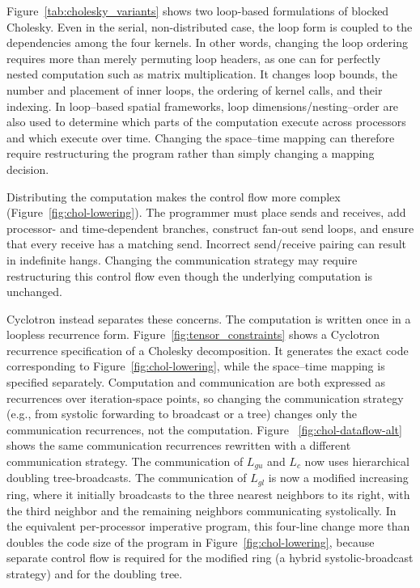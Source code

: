\documentclass[sigplan, nonacm]{acmart}
\begin{document}
Figure~\ref{tab:cholesky_variants} shows two loop-based formulations of blocked Cholesky. 
Even in the serial, non-distributed case, the loop form is coupled to the dependencies among the four kernels. In other words, changing the loop ordering requires more than merely permuting loop headers, as one can for perfectly nested computation such as matrix multiplication. 
It changes loop bounds, the number and placement of inner loops, the ordering of kernel calls, 
and their indexing. In loop--based spatial frameworks, loop dimensions/nesting--order are also used to determine
which parts of the computation execute across processors and which execute over time. 
Changing the space--time mapping can therefore require restructuring the program rather than
simply changing a mapping decision.

Distributing the computation makes the control flow more complex (Figure~\ref{fig:chol-lowering}). The programmer must place sends and receives, add processor- and time-dependent branches,
 construct fan-out send loops, and ensure that every receive has a matching send. 
 Incorrect send/receive pairing can result in indefinite hangs. Changing the communication strategy may require restructuring 
 this control flow even though the underlying computation is unchanged.

Cyclotron instead separates these concerns. The computation is written once in a loopless recurrence form. Figure~\ref{fig:tensor_constraints} shows a Cyclotron recurrence specification of a Cholesky decomposition. It generates the exact code corresponding to Figure~\ref{fig:chol-lowering}, 
while the space--time mapping is specified separately. 
Computation and communication are both expressed as recurrences over iteration-space points, 
so changing the communication strategy  (e.g., from systolic forwarding to broadcast or a tree) changes
only the communication recurrences, not the computation. Figure ~\ref{fig:chol-dataflow-alt} 
shows the same communication recurrences rewritten with a different communication strategy. The communication
of $L_{gu}$ and $L_{c}$ now uses hierarchical doubling tree-broadcasts. 
The communication of $L_{gl}$ is now a modified increasing ring, where it initially broadcasts
to the three nearest neighbors to its right, with the third neighbor and the remaining neighbors
communicating systolically. In the equivalent per-processor imperative program, 
this four-line change more than doubles the code size of the program in Figure~\ref{fig:chol-lowering},
because separate control flow is required for the modified ring (a hybrid systolic-broadcast strategy) and for the doubling tree.
\end{document}
